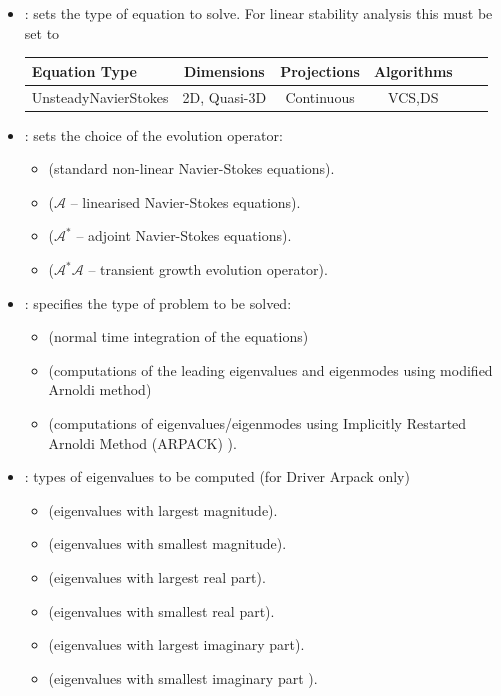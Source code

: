 \begin{itemize}
\item {}:  sets the type of equation to solve. For linear stability analysis this must be set to
\begin{center}
    \footnotesize
    \begin{tabular}{lccccc}
        \toprule
        {Equation Type} & {Dimensions} &{Projections} &{Algorithms} \\
        \midrule
        UnsteadyNavierStokes & 2D, Quasi-3D& Continuous &VCS,DS\\
        \bottomrule
    \end{tabular}
\end{center}

\item {}: sets the choice of the evolution operator:
\begin{itemize}
    \item {} (standard non-linear Navier-Stokes equations).
    \item {} ($\mathcal{A}$ -- linearised Navier-Stokes equations).
    \item {} ($\mathcal{A}^*$ -- adjoint Navier-Stokes equations).
    \item {} ($\mathcal{A}^*\mathcal{A}$ -- transient growth evolution operator).
\end{itemize}

\item {}: specifies  the type of problem to be solved:
   \begin{itemize}
    \item {} (normal time integration of the equations)
    \item {} (computations of the leading eigenvalues and eigenmodes using modified Arnoldi method)
    \item {} (computations of eigenvalues/eigenmodes using Implicitly Restarted Arnoldi Method (ARPACK) ).
    \end{itemize}

\item {}: types of eigenvalues to be computed (for Driver Arpack only)
\begin{itemize}
    \item {} (eigenvalues with largest magnitude).
    \item {} (eigenvalues with smallest magnitude).
    \item {} (eigenvalues with largest real part).
    \item {} (eigenvalues with smallest real part).
    \item {} (eigenvalues with largest imaginary part).
    \item {} (eigenvalues with smallest imaginary part ).
\end{itemize}


\end{itemize}
